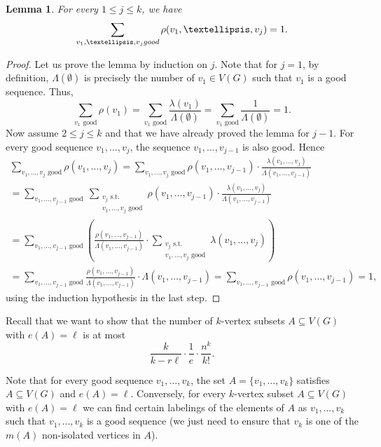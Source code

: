 \documentclass[11pt]{article}
\newtheorem{lemma}[theorem]{Lemma}
\theoremstyle{definition}
\numberwithin{equation}{section}
\begin{document}
\begin{lemma}\label{lemma1}For every $1\leq j\leq k$, we have
\[\sum_{v_1,\dots,v_{j} \textnormal { good}}\rho(v_1,\dots,v_j)= 1.\]
\end{lemma}
\begin{proof}
Let us prove the lemma by induction on $j$. Note that for $j=1$, by definition, $\Lambda(\emptyset)$ is precisely the number of $v_1\in V(G)$  such that $v_1$ is a good sequence. Thus, 
\[\sum_{v_1 \text { good}}\rho(v_1)=\sum_{v_1 \text { good}}\frac{\lambda(v_1)}{\Lambda(\emptyset)}=\sum_{v_1 \text { good}}\frac{1}{\Lambda(\emptyset)}=1.\]
Now assume $2\leq j\leq k$ and that we have already proved the lemma for $j-1$. For every good sequence $v_1,\dots,v_{j}$, the sequence $v_1,\dots,v_{j-1}$ is also good. Hence
\begin{multline*}
\sum_{v_1,\dots,v_{j} \text { good}}\rho(v_1,\dots,v_j)=\sum_{v_1,\dots,v_{j} \text { good}}\rho(v_1,\dots,v_{j-1})\cdot  \frac{\lambda(v_1,\dots,v_{j})}{\Lambda(v_1,\dots,v_{j-1})}\\
=\sum_{v_1,\dots,v_{j-1} \text { good}}\ \sum_{\substack{v_j\text{ s.t.\ }\\v_1,\dots,v_{j} \text { good}}} \rho(v_1,\dots,v_{j-1})\cdot  \frac{\lambda(v_1,\dots,v_{j})}{\Lambda(v_1,\dots,v_{j-1})}\\
=\sum_{v_1,\dots,v_{j-1} \text { good}}\left(\frac{\rho(v_1,\dots,v_{j-1})}{\Lambda(v_1,\dots,v_{j-1})}\cdot \sum_{\substack{v_j\text{ s.t.\ }\\v_1,\dots,v_{j} \text { good}}} \lambda(v_1,\dots,v_{j})\right)\\
=\sum_{v_1,\dots,v_{j-1} \text { good}} \frac{\rho(v_1,\dots,v_{j-1})}{\Lambda(v_1,\dots,v_{j-1})}\cdot \Lambda(v_1,\dots,v_{j-1})=\sum_{v_1,\dots,v_{j-1} \text { good}} \rho(v_1,\dots,v_{j-1})=1,
\end{multline*}
using the induction hypothesis in the last step.
\end{proof}

Recall that we want to show that the number of $k$-vertex subsets $A\subseteq V(G)$ with $e(A)=\ell$ is at most
\[\frac{k}{k-r\ell}\cdot \frac{1}{e}\cdot \frac{n^k}{k!}.\]

Note that for every good sequence $v_1,\dots,v_k$, the set $A=\lbrace v_1,\dots,v_k\rbrace$ satisfies $A\subseteq V(G)$ and $e(A)=\ell$.  Conversely, for every $k$-vertex subset $A\subseteq V(G)$ with $e(A)=\ell$ we can find certain labelings of the elements of $A$ as $v_1,\dots, v_k$ such that $v_1,\dots, v_k$ is a good sequence (we just need to ensure that $v_k$ is one of the $m(A)$ non-isolated vertices in $A$).
\end{document}
